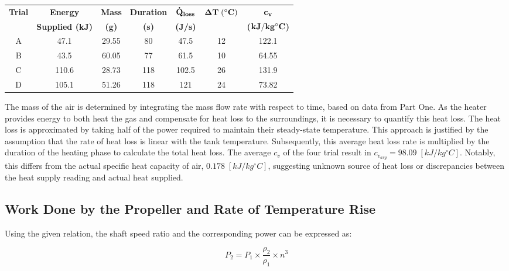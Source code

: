 \documentclass[12pt]{article}
\begin{document}
\begin{table}[h!]
\centering
\begin{tabular}{|c|c|c|c|c|c|c|}
\hline
\textbf{Trial} & \textbf{Energy} & \textbf{Mass} & \textbf{Duration} & \textbf{$\bf \dot Q_{loss}$} & \textbf{$\bf \Delta T \; (^{\circ}C)$} & \textbf{$\bf c_v$} \\
& \textbf{Supplied (kJ)} & \textbf{(g)} & \textbf{(s)} & \textbf{(J/s)} &  & \textbf{($\bf kJ/ kg ^{\circ}C$)} \\
\hline
A & 47.1 & 29.55 & 80 & 47.5 & 12 & 122.1 \\
\hline
B & 43.5 & 60.05 & 77 & 61.5 & 10 & 64.55 \\
\hline
C & 110.6 & 28.73 & 118 & 102.5 & 26 & 131.9 \\
\hline
D & 105.1 & 51.26 & 118 & 121 & 24 & 73.82 \\
\hline
\end{tabular}
\end{table}

The mass of the air is determined by integrating the mass flow rate with respect to time, based on data from Part One. As the heater provides energy to both heat the gas and compensate for heat loss to the surroundings, it is necessary to quantify this heat loss. The heat loss is approximated by taking half of the power required to maintain their steady-state temperature. This approach is justified by the assumption that the rate of heat loss is linear with the tank temperature. Subsequently, this average heat loss rate is multiplied by the duration of the heating phase to calculate the total heat loss. The average $c_v$ of the four trial result in $c_{v_{avg}} = 98.09 \; [kJ/ kg ^{\circ}C]$. Notably, this differs from the actual specific heat capacity of air, $0.178 \; [kJ/ kg ^{\circ}C]$, suggesting unknown source of heat loss or discrepancies between the heat supply reading and actual heat supplied.

\subsection{Work Done by the Propeller and Rate of Temperature Rise}

Using the given relation, the shaft speed ratio and the corresponding power can be expressed as:

\begin{equation}
    P_{2} = P_{1} \times \frac{\rho_{2}}{\rho_{1}} \times n^{3}
\end{equation}
\end{document}
